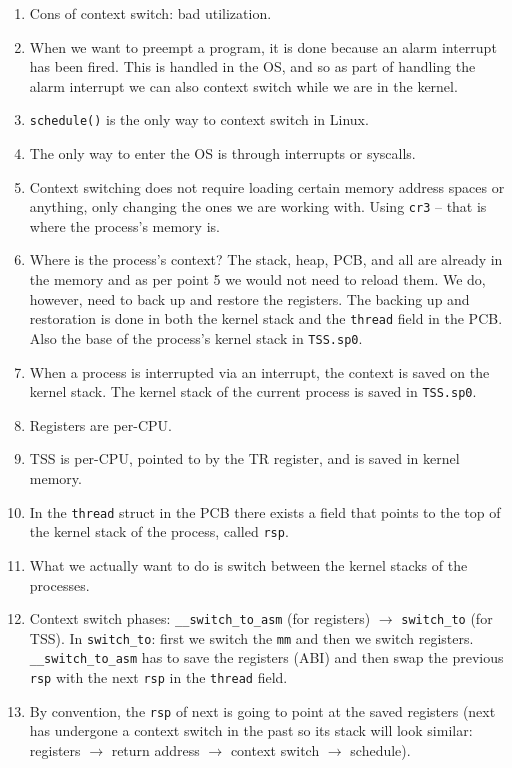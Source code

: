 \documentclass[12pt,a4paper]{article}
\begin{document}
\begin{enumerate}
  \item Cons of context switch: bad utilization.
  \item When we want to preempt a program, it is done because an alarm interrupt has been fired. This is handled in the OS, and so as part of handling the alarm interrupt we can also context switch while we are in the kernel.
  \item \texttt{schedule()} is the only way to context switch in Linux.
  \item The only way to enter the OS is through interrupts or syscalls.
  \item Context switching does not require loading certain memory address spaces or anything, only changing the ones we are working with. Using \texttt{cr3} -- that is where the process's memory is.
  \item Where is the process's context? The stack, heap, PCB, and all are already in the memory and as per point 5 we would not need to reload them. We do, however, need to back up and restore the registers. The backing up and restoration is done in both the kernel stack and the \texttt{thread} field in the PCB. Also the base of the process's kernel stack in \texttt{TSS.sp0}.
  \item When a process is interrupted via an interrupt, the context is saved on the kernel stack. The kernel stack of the current process is saved in \texttt{TSS.sp0}.
  \item Registers are per-CPU.
  \item TSS is per-CPU, pointed to by the TR register, and is saved in kernel memory.
  \item In the \texttt{thread} struct in the PCB there exists a field that points to the top of the kernel stack of the process, called \texttt{rsp}.
  \item What we actually want to do is switch between the kernel stacks of the processes.
  \item Context switch phases: \texttt{\_\_switch\_to\_asm} (for registers) $\to$ \texttt{switch\_to} (for TSS). In \texttt{switch\_to}: first we switch the \texttt{mm} and then we switch registers. \texttt{\_\_switch\_to\_asm} has to save the registers (ABI) and then swap the previous \texttt{rsp} with the next \texttt{rsp} in the \texttt{thread} field.
  \item By convention, the \texttt{rsp} of next is going to point at the saved registers (next has undergone a context switch in the past so its stack will look similar: registers $\to$ return address $\to$ context switch $\to$ schedule).

\end{enumerate}
\end{document}
